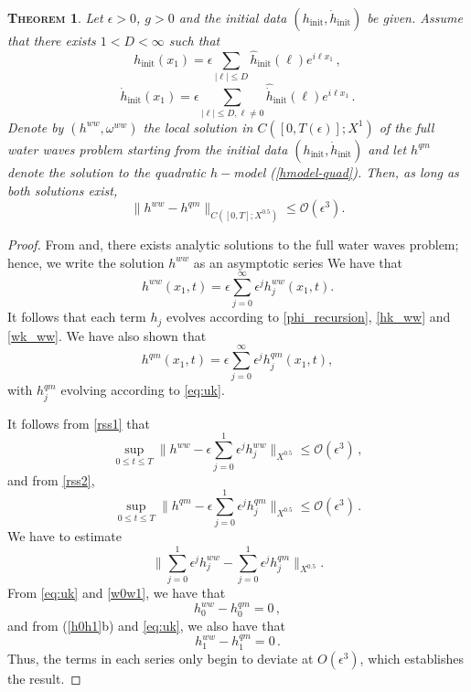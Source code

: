\documentclass[11pt]{article}
\theoremstyle{plain}
\newtheorem{theorem}{\scshape Theorem}
\theoremstyle{definition}
\theoremstyle{definition}
\def\hinit{h_{\operatorname{init}}}
\def\fhinit{\widehat{{ h}}_{\operatorname{init}}}
\def\htinit{{\dot h}_{\operatorname{init}}}
\def\fhtinit{\widehat{{\dot h}}_{\operatorname{init}}}
\begin{document}
\begin{theorem}\label{theorem5} Let $\epsilon>0$, $g > 0$ and the initial data $(\hinit, \htinit)$ be given. Assume that there exists $1<D<\infty$ such that
$$
\hinit(x_1)=\epsilon\sum_{|\ell|\leq D}\fhinit(\ell)e^{i\ell x_1}\,,
$$
$$
\htinit(x_1)=\epsilon\sum_{|\ell|\leq D,\ell\neq0}\fhtinit(\ell)e^{i\ell x_1}\,.
$$
Denote by $(h^{ww},\omega^{ww})$ the local solution in $C([0,T(\epsilon)];X^1)$ of the full water waves problem starting from the initial data $(\hinit, \htinit)$ and 
let $h^{qm}$ denote the solution to the quadratic $h-$model {\rm(\ref{hmodel-quad})}. Then, as long as both solutions exist, 
$$
\|h^{ww}-h^{qm}\|_{C([0,T];X^{0.5})}\leq \mathcal{O}(\epsilon^{3}).
$$
\end{theorem}
\begin{proof}
From \cite{ovsjannikov1974shallow} and\cite{shinbrot1976initial}, there exists analytic solutions to the full water waves problem; hence, we write the
solution $h^{ww}$ as an asymptotic series
We have that
\begin{equation}\label{rss1}
h^{ww}(x_1,t)=\epsilon\sum_{j=0}^\infty \epsilon^j h_j^{ww}(x_1,t).
\end{equation} 
It follows that each term $h_j$ 
evolves according to \eqref{phi_recursion}, \eqref{hk_ww} and \eqref{wk_ww}. 
We have  also shown that
\begin{equation}\label{rss2}
h^{qm}(x_1,t)=\epsilon\sum_{j=0}^\infty \epsilon^j h_j^{qm}(x_1,t),
\end{equation}  
with $h_j^{qm}$ evolving according to \eqref{eq:uk}.  

It follows from \eqref{rss1} that
$$
\sup_{0\leq t\leq T}\|h^{ww}-\epsilon\sum_{j=0}^1 \epsilon^j h_j^{ww}\|_{X^{0.5}}\leq \mathcal{O}(\epsilon^{3}) \,,
$$
and from \eqref{rss2},
$$
\sup_{0\leq t\leq T}\|h^{qm}-\epsilon\sum_{j=0}^1 \epsilon^j h_j^{qm}\|_{X^{0.5}}\leq \mathcal{O}(\epsilon^{3}) \,.
$$
We have to estimate
$$
\|\sum_{j=0}^1 \epsilon^j h_j^{ww}-\sum_{j=0}^1 \epsilon^j h_j^{qm}\|_{X^{0.5}}.
$$
From \eqref{eq:uk} and \eqref{w0w1}, we  have that
$$
h_0^{ww}-h_0^{qm}=0 \,,
$$
and from  (\ref{h0h1}b) and \eqref{eq:uk}, we also have that
$$
h_1^{ww}-h_1^{qm}=0 \,.
$$
Thus, the terms in each series only begin to deviate at $O( \epsilon ^3)$, which establishes the result.
\end{proof}
\end{document}
